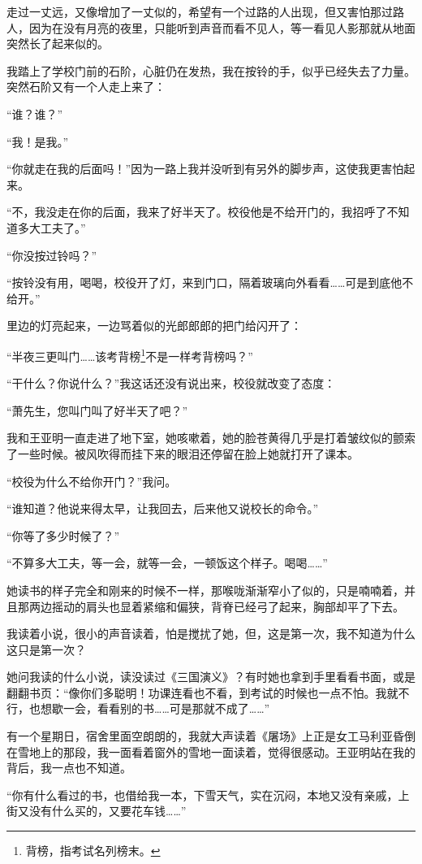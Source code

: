 \par 走过一丈远，又像增加了一丈似的，希望有一个过路的人出现，但又害怕那过路人，因为在没有月亮的夜里，只能听到声音而看不见人，等一看见人影那就从地面突然长了起来似的。
\par 我踏上了学校门前的石阶，心脏仍在发热，我在按铃的手，似乎已经失去了力量。突然石阶又有一个人走上来了：
\par “谁？谁？”
\par “我！是我。”
\par “你就走在我的后面吗！”因为一路上我并没听到有另外的脚步声，这使我更害怕起来。
\par “不，我没走在你的后面，我来了好半天了。校役他是不给开门的，我招呼了不知道多大工夫了。”
\par “你没按过铃吗？”
\par “按铃没有用，喝喝，校役开了灯，来到门口，隔着玻璃向外看看……可是到底他不给开。”
\par 里边的灯亮起来，一边骂着似的光郎郎郎的把门给闪开了：
\par “半夜三更叫门……该考背榜\footnote{背榜，指考试名列榜末。}不是一样考背榜吗？”
\par “干什么？你说什么？”我这话还没有说出来，校役就改变了态度：
\par “萧先生，您叫门叫了好半天了吧？”
\par 我和王亚明一直走进了地下室，她咳嗽着，她的脸苍黄得几乎是打着皱纹似的颤索了一些时候。被风吹得而挂下来的眼泪还停留在脸上她就打开了课本。
\par “校役为什么不给你开门？”我问。
\par “谁知道？他说来得太早，让我回去，后来他又说校长的命令。”
\par “你等了多少时候了？”
\par “不算多大工夫，等一会，就等一会，一顿饭这个样子。喝喝……”
\par 她读书的样子完全和刚来的时候不一样，那喉咙渐渐窄小了似的，只是喃喃着，并且那两边摇动的肩头也显着紧缩和偏狭，背脊已经弓了起来，胸部却平了下去。
\par 我读着小说，很小的声音读着，怕是搅扰了她，但，这是第一次，我不知道为什么这只是第一次？
\par 她问我读的什么小说，读没读过《三国演义》？有时她也拿到手里看看书面，或是翻翻书页：“像你们多聪明！功课连看也不看，到考试的时候也一点不怕。我就不行，也想歇一会，看看别的书……可是那就不成了……”
\par 有一个星期日，宿舍里面空朗朗的，我就大声读着《屠场》上正是女工马利亚昏倒在雪地上的那段，我一面看着窗外的雪地一面读着，觉得很感动。王亚明站在我的背后，我一点也不知道。
\par “你有什么看过的书，也借给我一本，下雪天气，实在沉闷，本地又没有亲戚，上街又没有什么买的，又要花车钱……”
